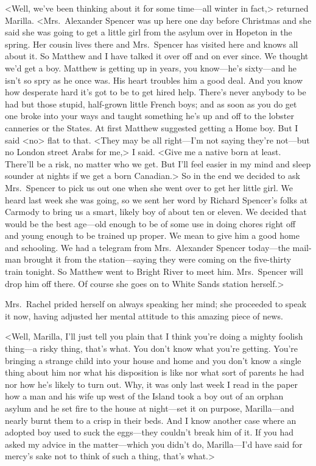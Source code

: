 <Well, we've been thinking about it for some time—all winter in fact,> returned Marilla. <Mrs.~Alexander Spencer was up here one day before Christmas and she said she was going to get a little girl from the asylum over in Hopeton in the spring. Her cousin lives there and Mrs.~Spencer has visited here and knows all about it. So Matthew and I have talked it over off and on ever since. We thought we'd get a boy. Matthew is getting up in years, you know—he's sixty—and he isn't so spry as he once was. His heart troubles him a good deal. And you know how desperate hard it's got to be to get hired help. There's never anybody to be had but those stupid, half-grown little French boys; and as soon as you do get one broke into your ways and taught something he's up and off to the lobster canneries or the States. At first Matthew suggested getting a Home boy. But I said <no> flat to that. <They may be all right—I'm not saying they're not—but no London street Arabs for me,> I said. <Give me a native born at least. There'll be a risk, no matter who we get. But I'll feel easier in my mind and sleep sounder at nights if we get a born Canadian.> So in the end we decided to ask Mrs.~Spencer to pick us out one when she went over to get her little girl. We heard last week she was going, so we sent her word by Richard Spencer's folks at Carmody to bring us a smart, likely boy of about ten or eleven. We decided that would be the best age—old enough to be of some use in doing chores right off and young enough to be trained up proper. We mean to give him a good home and schooling. We had a telegram from Mrs.~Alexander Spencer today—the mail-man brought it from the station—saying they were coming on the five-thirty train tonight. So Matthew went to Bright River to meet him. Mrs.~Spencer will drop him off there. Of course she goes on to White Sands station herself.>

Mrs.~Rachel prided herself on always speaking her mind; she proceeded to speak it now, having adjusted her mental attitude to this amazing piece of news.

<Well, Marilla, I'll just tell you plain that I think you're doing a mighty foolish thing—a risky thing, that's what. You don't know what you're getting. You're bringing a strange child into your house and home and you don't know a single thing about him nor what his disposition is like nor what sort of parents he had nor how he's likely to turn out. Why, it was only last week I read in the paper how a man and his wife up west of the Island took a boy out of an orphan asylum and he set fire to the house at night—set it on purpose, Marilla—and nearly burnt them to a crisp in their beds. And I know another case where an adopted boy used to suck the eggs—they couldn't break him of it. If you had asked my advice in the matter—which you didn't do, Marilla—I'd have said for mercy's sake not to think of such a thing, that's what.>

